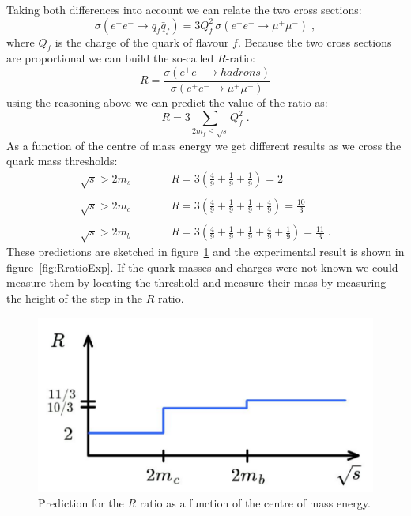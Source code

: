 \documentclass[12pt]{article}
\begin{document}
Taking both differences into account we can relate the two cross sections:
\[\sigma(e^+e^-\rightarrow q_f\bar q_f)=3 Q_f^2\,\sigma(e^+e^-\rightarrow \mu^+\mu^-)\;,\]
where $Q_f$ is the charge of the quark of flavour $f$. Because the two cross sections are proportional we can build the so-called $R$-ratio:
\[R=\frac{\sigma(e^+e^-\rightarrow hadrons)}{\sigma(e^+e^-\rightarrow \mu^+\mu^-)}\] 
using the reasoning above we can predict the value of the ratio as:
\[R=3\sum\limits_{2m_f\leq\sqrt{s}}Q_f^{2}\;.\]
As a function of the centre of mass energy we get different results as we cross the quark mass thresholds:
\[
\begin{array}{ccl}
\sqrt{s}>2m_{s} &\qquad&R= 3\left(\displaystyle \frac49+\frac19+\frac19\right)=2\\\\
\sqrt{s}>2m_{c} &\qquad&R= 3\left(\displaystyle\frac49+\frac19+\frac19+\frac49\right)=\displaystyle\frac{10}{3}\\\\
\sqrt{s}>2m_{b} &\qquad&R= 3\left(\displaystyle\frac49+\frac19+\frac19+\frac49+\frac19\right)=\displaystyle\frac{11}{3}\;.
\end{array}
\]
These predictions are sketched in figure~\ref{fig:Rratio} and the experimental result is shown in figure~\ref{fig:RratioExp}. 
If the quark masses and charges were not known we could measure them by locating the threshold and measure their mass by measuring the height of the step in the $R$ ratio. 
\begin{figure}
\begin{center}
\includegraphics[scale=0.3]{images/Rratio.png}
\end{center}
\caption{Prediction for the $R$ ratio as a function of the centre of mass energy.}\label{fig:Rratio}
\end{figure}
\end{document}
